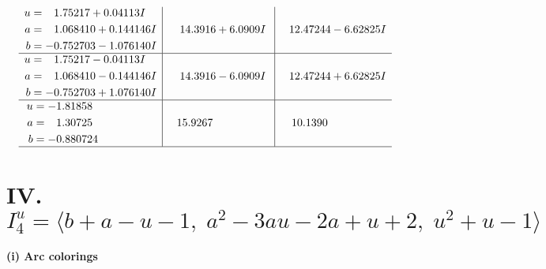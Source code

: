 \documentclass[1p]{elsarticle_modified}
\theoremstyle{definition}
\begin{document}
$$\begin{array}{c|c|c}
\begin{aligned}
u &= \phantom{-}1.75217 + 0.04113 I \\
a &= \phantom{-}1.068410 + 0.144146 I \\
b &= -0.752703 - 1.076140 I\end{aligned}
 & \phantom{-}14.3916 + 6.0909 I & \phantom{-}12.47244 - 6.62825 I \\ \hline\begin{aligned}
u &= \phantom{-}1.75217 - 0.04113 I \\
a &= \phantom{-}1.068410 - 0.144146 I \\
b &= -0.752703 + 1.076140 I\end{aligned}
 & \phantom{-}14.3916 - 6.0909 I & \phantom{-}12.47244 + 6.62825 I \\ \hline\begin{aligned}
u &= -1.81858\phantom{ +0.000000I} \\
a &= \phantom{-}1.30725\phantom{ +0.000000I} \\
b &= -0.880724\phantom{ +0.000000I}\end{aligned}
 & \phantom{-}15.9267\phantom{ +0.000000I} & \phantom{-}10.1390\phantom{ +0.000000I}\\
 \hline 
 \end{array}$$\newpage\newpage\renewcommand{\arraystretch}{1}
\centering \section*{IV. $I^u_{4}= \langle b+a- u-1,\;a^2-3 a u-2 a+u+2,\;u^2+u-1 \rangle$}
\flushleft \textbf{(i) Arc colorings}\\
\end{document}
